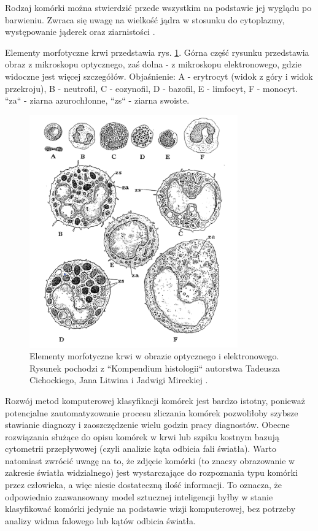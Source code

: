 Rodzaj komórki można stwierdzić przede wszystkim na podstawie jej wyglądu po barwieniu.
Zwraca się uwagę na wielkość jądra w stosunku do cytoplazmy, występowanie jąderek oraz ziarnistości \cite{histology}.

Elementy morfotyczne krwi przedstawia rys. \ref{fig:electron_microscope}.
Górna część rysunku przedstawia obraz z mikroskopu optycznego, zaś dolna - z mikroskopu elektronowego, gdzie widoczne jest więcej szczegółów.
Objaśnienie: A - erytrocyt (widok z góry i widok przekroju), B - neutrofil, C - eozynofil, D - bazofil, E - limfocyt, F - monocyt. “za“ - ziarna azurochłonne, “zs“
- ziarna swoiste.

\begin{figure}
    \centering
    \includegraphics[width=0.8\textwidth]{morfotyczne}
    \caption{Elementy morfotyczne krwi w obrazie optycznego i elektronowego. Rysunek pochodzi z “Kompendium histologii“ autorstwa Tadeusza Cichockiego, Jana Litwina i Jadwigi Mireckiej \cite{histology}.}
    \label{fig:electron_microscope}
\end{figure}

Rozwój metod komputerowej klasyfikacji komórek jest bardzo istotny, ponieważ potencjalne zautomatyzowanie procesu zliczania komórek pozwoliłoby szybsze stawianie diagnozy i zaoszczędzenie wielu godzin pracy diagnostów.
Obecne rozwiązania służące do opisu komórek w krwi lub szpiku kostnym bazują cytometrii przepływowej (czyli analizie kąta odbicia fali światła).
Warto natomiast zwrócić uwagę na to, że zdjęcie komórki (to znaczy obrazowanie w zakresie światła widzialnego) jest wystarczające do rozpoznania typu komórki przez człowieka, a więc niesie dostateczną ilość informacji.
To oznacza, że odpowiednio zaawansowany model sztucznej inteligencji byłby w stanie klasyfikować komórki jedynie na podstawie wizji komputerowej, bez potrzeby analizy widma falowego lub kątów odbicia światła.


